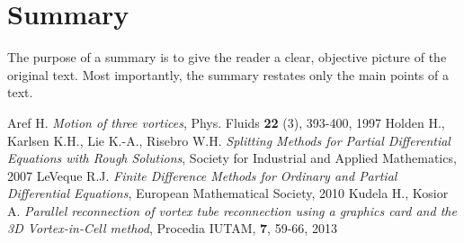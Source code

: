 \documentclass[polish,twoside]{article}
\begin{document}
\section{Summary}

The purpose of a summary is to give the reader a clear, objective picture of the original text. Most importantly, the summary restates only the main points of a text.

\begin{thebibliography}{10}
{\small
{} Aref H.  \textit{Motion of three vortices}, Phys. Fluids \textbf{22} (3), 393-400, 1997
 Holden H., Karlsen K.H., Lie K.-A., Risebro W.H. \textit{Splitting Methods for Partial Differential Equations with Rough Solutions}, Society for Industrial and Applied Mathematics,  2007
 LeVeque R.J. \textit{Finite Difference Methods for Ordinary and Partial Differential Equations}, European Mathematical Society, 2010
 Kudela H., Kosior A. \textit{Parallel reconnection of vortex tube reconnection using a graphics card and the 3D Vortex-in-Cell method}, Procedia IUTAM, \textbf{7}, 59-66, 2013
}
\end{thebibliography}
\end{document}
